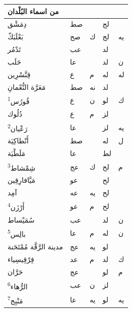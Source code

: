 \documentclass[11pt]{article}
\newcommand{\AbjadZero}{{\NallinoSigns\symbol{"E000}}}
\begin{document}
\begin{Arabic}
\noindent\begin{minipage}[t]{0.495\textwidth}\setlength{\tabcolsep}{2.2pt}\begin{tabular}{|p{55mm}|>{\centering\arraybackslash}p{4.8mm}>{\centering\arraybackslash}p{4.8mm}|>{\centering\arraybackslash}p{4.8mm}>{\centering\arraybackslash}p{4.8mm}|}\hline
\centering من اسماء البُلْدان & \multicolumn{2}{c|}{الطول} & \multicolumn{2}{c|}{العرض} \\ \hline
{}دِمَشْق & صط & \AbjadZero{} & لج & \AbjadZero{} \\
{}بَعْلَبَكّ & صح & ك & لج & يه \\
{}تَدْمُر & عب & \AbjadZero{} & لد & \AbjadZero{} \\
{}حَلَب & عا & \AbjadZero{} & لد & ن \\
{}قِنَّسْرِين & ع & م & له & له \\
{}مَعَرَّة النُّعْمانِ & صط & نه & لد & \AbjadZero{} \\
{}قُورُس\textsuperscript{1} & ع & ن & لو & ك \\
{}دُلُوك & ع & م & لز & \AbjadZero{} \\
{}رَعْبان\textsuperscript{2} & عا & \AbjadZero{} & لز & يه \\
{}أَنْطاكِيَة & صط & \AbjadZero{} & له & ل \\
{}مَلَطْيَة & عا & \AbjadZero{} & لط & \AbjadZero{} \\
{}شِمْشاط\textsuperscript{3} & عج & ك & لح & م \\
{}مَيَّافارِقِين & عو & \AbjadZero{} & لح & \AbjadZero{} \\
{}آمِد & عه & يه & لح & \AbjadZero{} \\
{}أَرْزَن\textsuperscript{4} & عو & م & لح & \AbjadZero{} \\
{}سُمَيْساط & عب & \AbjadZero{} & لد & ن \\
{}بالِس\textsuperscript{5} & عا & م & له & ن \\
{}مدينة الرَّقَّة مُمْتَحَنة & عج & يه & لو & \AbjadZero{} \\
{}قِرْقِيسِياء & عد & م & لد & ك \\
{}حَرَّان & عج & \AbjadZero{} & لو & م \\
{}الرُّهاء\textsuperscript{6} & عب & ن & لز & \AbjadZero{} \\
{}مَنْبِج\textsuperscript{7} & عا & يه & لو & يه \\
\hline\end{tabular}\end{minipage}\hfill\begin{minipage}[t]{0.495\textwidth}\setlength{\tabcolsep}{2.2pt}\begin{tabular}{|p{55mm}|>{\centering\arraybackslash}p{4.8mm}>{\centering\arraybackslash}p{4.8mm}|>{\centering\arraybackslash}p{4.8mm}>{\centering\arraybackslash}p{4.8mm}|}\hline

\end{tabular}
\end{minipage}
\end{Arabic}
\end{document}
